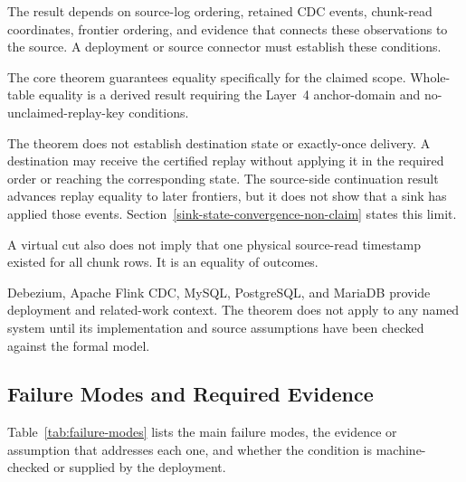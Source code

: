 \documentclass[letterpaper,10pt,twocolumn]{article}
\begin{document}
The result depends on source-log ordering, retained CDC events,
chunk-read coordinates, frontier ordering, and evidence that connects
these observations to the source. A deployment or source connector must
establish these conditions.

The core theorem guarantees equality specifically for the claimed scope.
Whole-table equality is a derived result requiring the Layer~4
anchor-domain and no-unclaimed-replay-key conditions.

The theorem does not establish destination state or exactly-once delivery.
A destination may receive the certified replay without applying
it in the required order or reaching the corresponding state. The
source-side continuation result advances replay equality to later
frontiers, but it does not show that a sink has applied those events.
Section~\ref{sink-state-convergence-non-claim} states this limit.

A virtual cut also does not imply that one physical source-read
timestamp existed for all chunk rows. It is an equality of outcomes.

Debezium, Apache Flink CDC, MySQL, PostgreSQL, and MariaDB provide
deployment and related-work context. The theorem does not apply to any
named system until its implementation and source assumptions have been
checked against the formal model.

\subsection{Failure Modes and Required
Evidence}\label{sec:failure-modes-evidence}

Table~\ref{tab:failure-modes} lists the main failure modes, the evidence
or assumption that addresses each one, and whether the condition is
machine-checked or supplied by the deployment.
\end{document}
